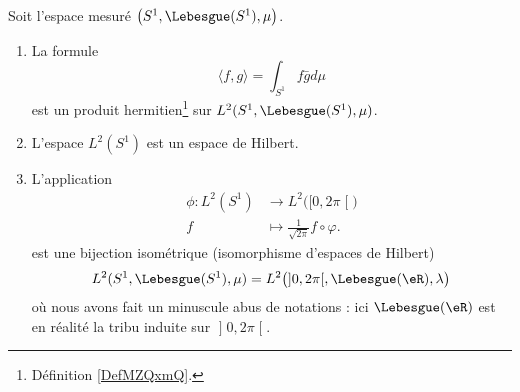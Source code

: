 \begin{proposition}     \label{PROPooDJERooYirMru}
    Soit l'espace mesuré \( \big( S^1,\Lebesgue(S^1), \mu \big)\).
    \begin{enumerate}
            \item
                La formule
                \begin{equation}        \label{EQooHPFQooEaujfZ}
                    \langle f, g\rangle =\int_{S^1}f\bar gd\mu
                \end{equation}
                est un produit hermitien\footnote{Définition \ref{DefMZQxmQ}.} sur \( L^2(S^1,\Lebesgue(S^1),\mu)\).
            \item
                L'espace \( L^2(S^1)\) est un espace de Hilbert.
            \item       \label{ITEMooQZAPooKEeQBW}
    L'application
    \begin{equation}
        \begin{aligned}
            \phi\colon L^2(S^1)&\to L^2\big( \mathopen[ 0 , 2\pi \mathclose[ \big) \\
                f&\mapsto \frac{1}{ \sqrt{ 2\pi } }f\circ \varphi.
        \end{aligned}
    \end{equation}
            est une bijection isométrique (isomorphisme d'espaces de Hilbert)
            \begin{equation}
            L^2(S^1,\Lebesgue(S^1),\mu)=L^2\big( \mathopen] 0  , 2\pi \mathclose[,\Lebesgue(\eR),\lambda \big)
            \end{equation}
        où nous avons fait un minuscule abus de notations : ici \( \Lebesgue(\eR)\) est en réalité la tribu induite sur \( \mathopen] 0 , 2\pi \mathclose[\).
    \end{enumerate}
\end{proposition}

